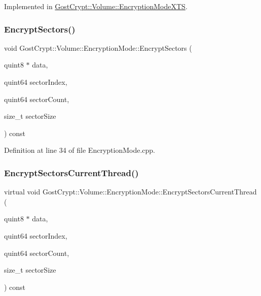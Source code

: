 Implemented in \hyperlink{class_gost_crypt_1_1_volume_1_1_encryption_mode_x_t_s_a2802c291ee815c9ed2280aa1498d7afb}{Gost\+Crypt\+::\+Volume\+::\+Encryption\+Mode\+X\+TS}.

\mbox{\label{class_gost_crypt_1_1_volume_1_1_encryption_mode_a30755acb23df4d96930d7ac07760eab6}} 
\subsubsection{\texorpdfstring{Encrypt\+Sectors()}{EncryptSectors()}}
{\footnotesize\ttfamily void Gost\+Crypt\+::\+Volume\+::\+Encryption\+Mode\+::\+Encrypt\+Sectors (\begin{DoxyParamCaption}\item[{quint8 $\ast$}]{data,  }\item[{quint64}]{sector\+Index,  }\item[{quint64}]{sector\+Count,  }\item[{size\+\_\+t}]{sector\+Size }\end{DoxyParamCaption}) const\hspace{0.3cm}{\ttfamily [virtual]}}



Definition at line 34 of file Encryption\+Mode.\+cpp.

\mbox{\label{class_gost_crypt_1_1_volume_1_1_encryption_mode_a2b6d85199f01ab2055476d62d49d99e1}} 
\subsubsection{\texorpdfstring{Encrypt\+Sectors\+Current\+Thread()}{EncryptSectorsCurrentThread()}}
{\footnotesize\ttfamily virtual void Gost\+Crypt\+::\+Volume\+::\+Encryption\+Mode\+::\+Encrypt\+Sectors\+Current\+Thread (\begin{DoxyParamCaption}\item[{quint8 $\ast$}]{data,  }\item[{quint64}]{sector\+Index,  }\item[{quint64}]{sector\+Count,  }\item[{size\+\_\+t}]{sector\+Size }\end{DoxyParamCaption}) const\hspace{0.3cm}{\ttfamily [pure virtual]}}



